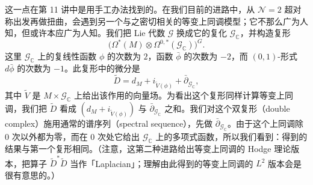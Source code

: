 
这一点在第 11 讲中是用手工办法找到的。在我们目前的进路中，从 $\mathcal N=2$ 超对称出发再做扭曲，会遇到另一个与之密切相关的等变上同调模型；它不那么广为人知，但或许本应广为人知。我们把 Lie 代数 $\mathcal G$ 换成它的复化 $\mathcal G_{\mathbb C}$，并构造复形
\[
  \bigl(\Omega^*(M)\otimes\Omega^{0,*}(\mathcal G_{\mathbb C})\bigr)^G.
\]
这里 $\mathcal G_{\mathbb C}$ 上的复线性函数 $\phi$ 的次数为 $2$，函数 $\bar\phi$ 的次数为 $-2$，而 $(0,1)$-形式 $d\bar\phi$ 的次数为 $-1$。此复形中的微分是
\[
  \widetilde D=d_M+i_{\widetilde V(\phi)}+\bar\partial_{\mathcal G_{\mathbb C}},
\]
其中 $\widetilde V$ 是 $M\times\mathcal G_{\mathbb C}$ 上给出该作用的向量场。为看出这个复形同样计算等变上同调，我们把 $\widetilde D$ 看成 $(d_M+i_{\widetilde V(\phi)})$ 与 $\bar\partial_{\mathcal G_{\mathbb C}}$ 之和。我们对这个双复形（double complex）施用通常的谱序列（spectral sequence），先做 $\bar\partial_{\mathcal G_{\mathbb C}}$。由于这个上同调除 $0$ 次以外都为零，而在 $0$ 次处它给出 $\mathcal G_{\mathbb C}$ 上的多项式函数，所以我们看到：得到的结果与第一个复形相同。（注意，这第二种进路给出等变上同调的 Hodge 理论版本，把算子 $\widetilde D^*\widetilde D$ 当作「Laplacian」；理解由此得到的等变上同调的 $L^2$ 版本会是很有意思的。）


